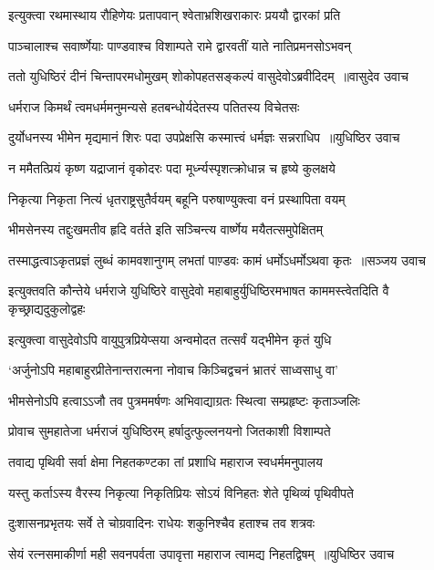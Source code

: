 \twolineshloka
{इत्युक्त्वा रथमास्थाय रौहिणेयः प्रतापवान्}
{श्वेताभ्रशिखराकारः प्रययौ द्वारकां प्रति}


\twolineshloka
{पाञ्चालाश्च सवार्ष्णेयाः पाण्डवाश्च विशाम्पते}
{रामे द्वारवतीं याते नातिप्रमनसोऽभवन्}


\threelineshloka
{ततो युधिष्ठिरं दीनं चिन्तापरमधोमुखम्}
{शोकोपहतसङ्कल्पं वासुदेवोऽब्रवीदिदम् ॥वासुदेव उवाच}
{}


\twolineshloka
{धर्मराज किमर्थं त्वमधर्ममनुमन्यसे}
{हतबन्धोर्यदेतस्य पतितस्य विचेतसः}


\threelineshloka
{दुर्योधनस्य भीमेन मृद्यमानं शिरः पदा}
{उपप्रेक्षसि कस्मात्त्वं धर्मज्ञः सन्नराधिप ॥युधिष्ठिर उवाच}
{}


\twolineshloka
{न ममैतत्प्रियं कृष्ण यद्राजानं वृकोदरः}
{पदा मूर्ध्न्यस्पृशत्क्रोधान्न च हृष्ये कुलक्षये}


\twolineshloka
{निकृत्या निकृता नित्यं धृतराष्ट्रसुतैर्वयम्}
{बहूनि परुषाण्युक्त्वा वनं प्रस्थापिता वयम्}


\twolineshloka
{भीमसेनस्य तद्दुःखमतीव हृदि वर्तते}
{इति सञ्चिन्त्य वार्ष्णेय मयैतत्समुपेक्षितम्}


\threelineshloka
{तस्माद्धत्वाऽकृतप्रज्ञं लुब्धं कामवशानुगम्}
{लभतां पाण़्डवः कामं धर्मोऽधर्मोऽथवा कृतः ॥सञ्जय उवाच}
{}


\threelineshloka
{इत्युक्तवति कौन्तेये धर्मराजे युधिष्ठिरे}
{वासुदेवो महाबाहुर्युधिष्ठिरमभाषत}
{काममस्त्वेतदिति वै कृच्छ्राद्यदुकुलोद्वहः}


\twolineshloka
{इत्युक्त्वा वासुदेवोऽपि वायुपुत्रप्रियेप्सया}
{अन्वमोदत तत्सर्वं यद्भीमेन कृतं युधि}


\twolineshloka
{`अर्जुनोऽपि महाबाहुरप्रीतेनान्तरात्मना}
{नोवाच किञ्चिद्वचनं भ्रातरं साध्वसाधु वा'}


\twolineshloka
{भीमसेनोऽपि हत्वाऽऽजौ तव पुत्रममर्षणः}
{अभिवाद्याग्रतः स्थित्वा सम्प्रहृष्टः कृताञ्जलिः}


\twolineshloka
{प्रोवाच सुमहातेजा धर्मराजं युधिष्ठिरम्}
{हर्षादुत्फुल्लनयनो जितकाशी विशाम्पते}


\twolineshloka
{तवाद्य पृथिवी सर्वा क्षेमा निहतकण्टका}
{तां प्रशाधि महाराज स्वधर्ममनुपालय}


\twolineshloka
{यस्तु कर्ताऽस्य वैरस्य निकृत्या निकृतिप्रियः}
{सोऽयं विनिहतः शेते पृथिव्यं पृथिवीपते}


\twolineshloka
{दुःशासनप्रभृतयः सर्वे ते चोग्रवादिनः}
{राधेयः शकुनिश्चैव हताश्च तव शत्रवः}


\threelineshloka
{सेयं रत्नसमाकीर्णा मही सवनपर्वता}
{उपावृत्ता महाराज त्वामद्य निहतद्विषम् ॥युधिष्ठिर उवाच}
{}


